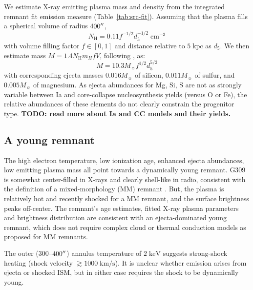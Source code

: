\documentclass[preprint2,tighten,trackchanges]{aastex6}
\newcommand*{\mt}{\mathrm}
\newcommand*{\unit}[1]{\;\mt{#1}}  %
\newcommand*{\nH}{N_{\mathrm{H}}}
\begin{document}
\begin{figure*}[!ht]
    \label{fig:kt-tau-radius}
\end{figure*}

We estimate X-ray emitting plasma mass and density from the integrated remnant
fit emission measure (Table~\ref{tab:src-fit}).
Assuming that the plasma fills a spherical volume of radius $400\mbox{$^{\prime\prime}$}$,
\[
    \nH = 0.11 f^{-1/2} d_{5}^{-1/2} \unit{cm^{-3}}
\]
with volume filling factor $f \in [0,1]$ and distance relative to $5
\unit{kpc}$ as $d_{5}$.
We then estimate mass $M = 1.4 \nH m_{H} f V$, following \citet{auchettl2015},
as:
\[
    M = 10.3 M_{\sun} f^{1/2} d_{5}^{5/2}
\]
with corresponding ejecta masses $0.016 M_{\sun}$ of silicon, $0.011 M_{\sun}$
of sulfur, and $0.005 M_{\sun}$ of magnesium.
As ejecta abundances for Mg, Si, S are not as strongly variable between Ia and
core-collapse nucleosynthesis yields (versus O or Fe), the relative abundances
of these elements do not clearly constrain the progenitor type.
\textbf{TODO: read more about Ia and CC models and their yields.}


\subsection{A young remnant}

The high electron temperature, low ionization age, enhanced ejecta abundances,
low emitting plasma mass all point towards a dynamically young remnant.
G309 is somewhat center-filled in X-rays and clearly shell-like in radio,
consistent with the definition of a mixed-morphology (MM) remnant
\citep{rho1998}.
But, the plasma is relatively hot and recently shocked for a MM remnant, and
the surface brightness peaks off-center.
The remnant's age estimates, fitted X-ray plasma parameters and brightness
distribution are consistent with an ejecta-dominated young remnant, which
does not require complex cloud or thermal conduction models as proposed for MM
remnants.

The outer ($300$--$400\mbox{$^{\prime\prime}$}$) annulus temperature of $2 \unit{keV}$
suggests strong-shock heating (shock velocity $\gtrsim 1000 \unit{km/s}$).
It is unclear whether emission arises from ejecta or shocked ISM, but in either
case requires the shock to be dynamically young.
\end{document}
